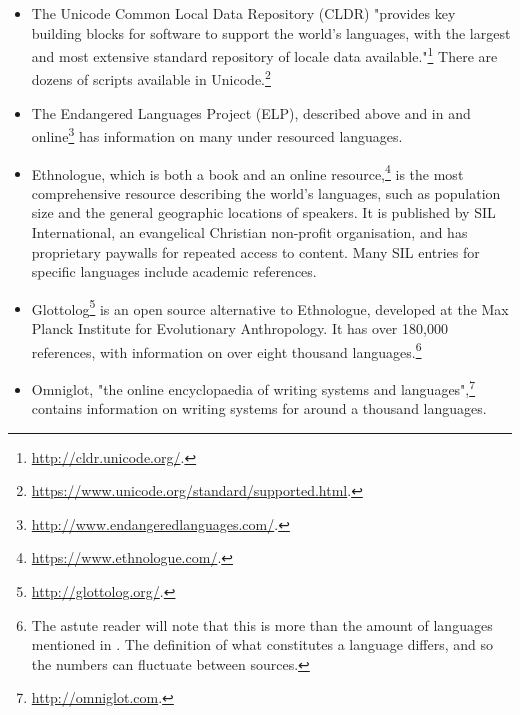 \begin{itemize}
\item The Unicode Common Local Data Repository (CLDR) "provides key \\ building blocks for software to support the world's languages, with the largest and most extensive standard repository of locale data available."\footnote{\href{http://cldr.unicode.org/}{http://cldr.unicode.org/}. } There are dozens of scripts available in Unicode.\footnote{\href{https://www.unicode.org/standard/supported.html}{https://www.unicode.org/standard/supported.html}. }

\item The Endangered Languages Project (ELP), described above and in \citet{lee2016assessing} and online\footnote{\href{http://www.endangeredlanguages.com/}{http://www.endangeredlanguages.com/}. } has information on many under resourced languages.

\item Ethnologue, which is both a book \citep{lewis2009ethnologue} and an online resource,\footnote{\href{https://www.ethnologue.com/}{https://www.ethnologue.com/}. } is the most comprehensive resource describing the world's languages, such as population size and the general geographic locations of speakers. It is published by SIL International, an evangelical Christian non-profit organisation, and has proprietary paywalls for repeated access to content. Many SIL entries for specific languages include academic references.

\item Glottolog\footnote{\href{http://glottolog.org/}{http://glottolog.org/}. } is an open source alternative to Ethnologue, developed at the Max Planck Institute for Evolutionary Anthropology. It has over 180,000 references, with information on over eight thousand languages.\footnote{The astute reader will note that this is more than the amount of languages mentioned in \citet{lewis2009ethnologue}. The definition of what constitutes a language differs, and so the numbers can fluctuate between sources.} \citep{hammarstrom2015glottolog}

\item Omniglot, "the online encyclopaedia of writing systems and languages",\footnote{\href{http://omniglot.com}{http://omniglot.com}. } contains information on writing systems for around a thousand languages. \citep{ager2008omniglot}


\end{itemize}
